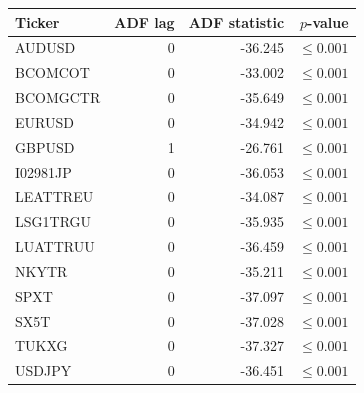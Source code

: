 \par\medskip\noindent
{\small
\begin{tabular}{@{}lrrr@{}}
\toprule
Ticker & ADF lag & ADF statistic & $p$-value\\
\midrule
AUDUSD & 0 & -36.245 & $\leq 0.001$\\
BCOMCOT & 0 & -33.002 & $\leq 0.001$\\
BCOMGCTR & 0 & -35.649 & $\leq 0.001$\\
EURUSD & 0 & -34.942 & $\leq 0.001$\\
GBPUSD & 1 & -26.761 & $\leq 0.001$\\
I02981JP & 0 & -36.053 & $\leq 0.001$\\
LEATTREU & 0 & -34.087 & $\leq 0.001$\\
LSG1TRGU & 0 & -35.935 & $\leq 0.001$\\
LUATTRUU & 0 & -36.459 & $\leq 0.001$\\
NKYTR & 0 & -35.211 & $\leq 0.001$\\
SPXT & 0 & -37.097 & $\leq 0.001$\\
SX5T & 0 & -37.028 & $\leq 0.001$\\
TUKXG & 0 & -37.327 & $\leq 0.001$\\
USDJPY & 0 & -36.451 & $\leq 0.001$\\
\bottomrule
\end{tabular}
}
\par\medskip

